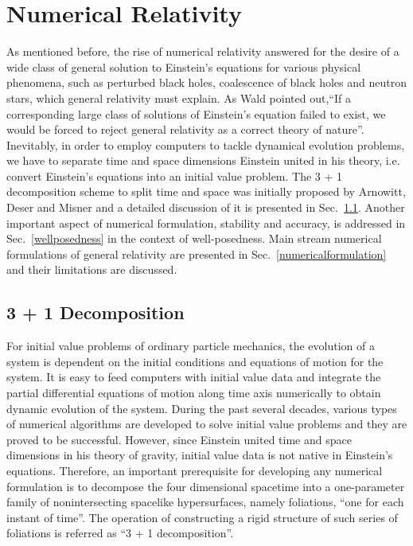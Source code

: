 \chapter{Numerical Relativity}\label{nr}
As mentioned before, the rise of numerical relativity answered for the desire of a wide class of general solution to Einstein's equations for various physical phenomena, such as perturbed black holes, coalescence of black holes and neutron stars, which general relativity must explain. As Wald pointed out,``If a corresponding large class of solutions of Einstein's equation failed to exist, we would be forced to reject general relativity as a correct theory of nature''\cite{Wald}. Inevitably, in order to employ computers to tackle dynamical evolution problems, we have to separate time and space dimensions Einstein united in his theory, i.e. convert Einstein's equations into an initial value problem. The 3 + 1 decomposition scheme to split time and space was initially proposed by Arnowitt, Deser and Misner\cite{ADM:Witten} and a detailed discussion of it is presented in Sec.~\ref{3+1}. Another important aspect of numerical formulation, stability and accuracy, is addressed in Sec.~\ref{wellposedness} in the context of well-posedness. Main stream numerical formulations of general relativity are presented in Sec.~\ref{numericalformulation} and their limitations are discussed. 
\section{3 + 1 Decomposition}\label{3+1}
For initial value problems of ordinary particle mechanics, the evolution of a system is dependent on the initial conditions and equations of motion for the system. It is easy to feed computers with initial value data and integrate the partial differential equations of motion along time axis numerically to obtain dynamic evolution of the system. During the past several decades, various types of numerical algorithms are developed to solve initial value problems and they are proved to be successful. However, since Einstein united time and space dimensions in his theory of gravity, initial value data is not native in Einstein's equations. Therefore, an important prerequisite for developing any numerical formulation is to decompose the four dimensional spacetime into a one-parameter family of nonintersecting spacelike hypersurfaces, namely foliations, ``one for each instant of time''. The operation of constructing a rigid structure of such series of foliations is referred as ``3 + 1 decomposition''. 


